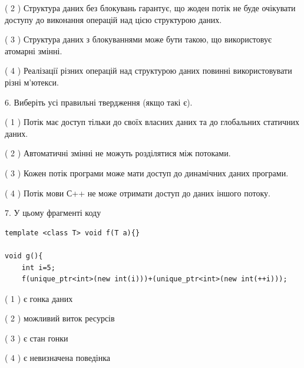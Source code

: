 \documentclass[12pt, ukrainian]{article}
\begin{document}
\begin {large}
{( 2 ) Структура даних без блокувань гарантує, що жоден потік не буде очікувати доступу до виконання операцій над цією структурою даних.%

( 3 ) Структура даних з блокуваннями може бути такою, що використовує атомарні змінні.%

( 4 ) Реалізації різних операцій над структурою даних повинні використовувати різні м’ютекси.%
\newpage



\vspace{5mm}
6. Виберіть усі правильні твердження (якщо такі є).\par
\vspace{2mm}

( 1 ) Потік має доступ тільки до своїх власних даних та до глобальних статичних даних.%

( 2 ) Автоматичні змінні не можуть розділятися між потоками.%

( 3 ) Кожен потік програми може мати доступ до динамічних даних програми.%

( 4 ) Потік мови С++ не може отримати доступ до даних іншого потоку.%


\vspace{5mm}
7. У цьому фрагменті коду
\begin{verbatim}
template <class T> void f(T a){}

void g(){
    int i=5;
    f(unique_ptr<int>(new int(i)))+(unique_ptr<int>(new int(++i)));
\end{verbatim}
( 1 ) є гонка даних%

( 2 ) можливий виток ресурсів%

( 3 ) є стан гонки%

( 4 ) є невизначена поведінка%
}
\end {large}
\end{document}
